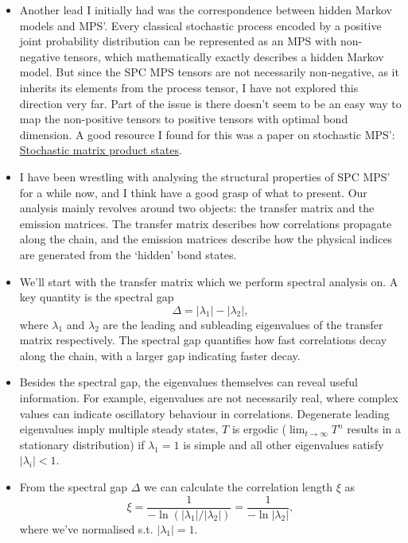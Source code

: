 \begin{itemize}
    \[
    T = \sum_x A_{(x)},
    \]
    or in tensor notation
    \[\mathbf{T}^{\mu_j}{}_{\mu_{j+1}} = \sum_{x_j} \mathbf{A}^{\mu_j}{}_{x_j \mu_{j+1}}.\]
    \item Another lead I initially had was the correspondence between hidden Markov models and MPS'. Every classical stochastic process encoded by a positive joint probability distribution can be represented as an MPS with non-negative tensors, which mathematically exactly describes a hidden Markov model. But since the SPC MPS tensors are not necessarily non-negative, as it inherits its elements from the process tensor, I have not explored this direction very far. Part of the issue is there doesn't seem to be an easy way to map the non-positive tensors to positive tensors with optimal bond dimension. A good resource I found for this was a paper on stochastic MPS': \href{https://arxiv.org/abs/1003.2545}{Stochastic matrix product states}.
    \item I have been wrestling with analysing the structural properties of SPC MPS' for a while now, and I think have a good grasp of what to present. Our analysis mainly revolves around two objects: the transfer matrix and the emission matrices. The transfer matrix describes how correlations propagate along the chain, and the emission matrices describe how the physical indices are generated from the `hidden' bond states.
    \item We'll start with the transfer matrix which we perform spectral analysis on. A key quantity is the spectral gap
    \[\Delta = |\lambda_1| - |\lambda_2|,\]
    where \(\lambda_1\) and \(\lambda_2\) are the leading and subleading eigenvalues of the transfer matrix respectively. The spectral gap quantifies how fast correlations decay along the chain, with a larger gap indicating faster decay.
    \item Besides the spectral gap, the eigenvalues themselves can reveal useful information. For example, eigenvalues are not necessarily real, where complex values can indicate oscillatory behaviour in correlations. Degenerate leading eigenvalues imply multiple steady states, \(T\) is ergodic (\(
    \lim_{t\to\infty} T^n\) results in a stationary distribution) if \(\lambda_1 = 1\) is simple and all other eigenvalues satisfy \(|\lambda_i| < 1\).
    \item From the spectral gap $\Delta$ we can calculate the correlation length \(\xi\) as
    \[\xi = \frac{1}{-\ln{(|\lambda_1|/|\lambda_2|)}} = \frac{1}{-\ln{|\lambda_2|}},
    \]
    where we've normalised s.t. \(|\lambda_1| = 1\).

\end{itemize}
